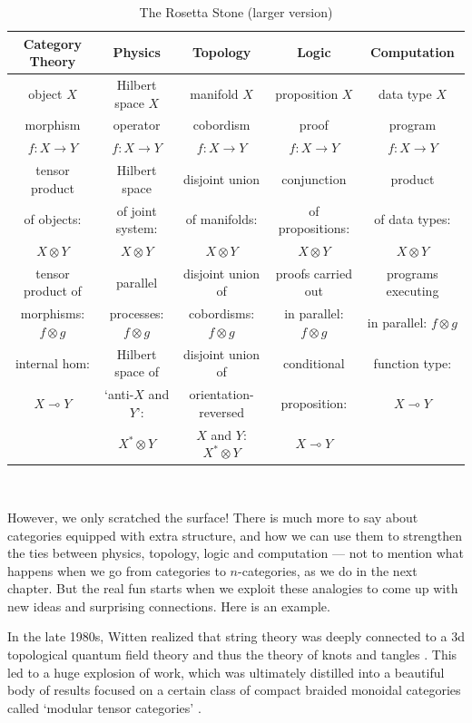 \documentclass[12pt,twoside,openright]{report}
\newcommand{\maps}{\colon}
\newcommand{\lhom}{\multimap}
\newcommand{\tensor}{\otimes}
\begin{document}
\begin{table}[h]
\begin{center}
\begin{tabular}{|c|c|c|c|c|}
\hline Category Theory & Physics & Topology  & Logic & Computation 
\\
\hline object $X$       &
Hilbert space $X$  &
manifold $X$ &
proposition $X$ &
data type $X$
\\
\hline morphism &
operator &
cobordism &
proof  &
program  \\
$f\maps X \to Y$ &
$f\maps X \to Y$ &
$f \maps X \to Y$ &
$f \maps X \to Y$ &
$f \maps X \to Y$
\\
\hline tensor product  &
Hilbert space   &
disjoint union &
conjunction &
product 
\\
of objects: &
of joint system: &
of manifolds: &
of propositions: &
of data types: 
\\
$X \tensor Y$ &
$X \tensor Y$ &
$X \tensor Y$ &
$X \tensor Y$ &
$X \tensor Y$
\\
\hline tensor product of &
parallel  &
disjoint union of &
proofs carried out & 
programs executing
\\
morphisms: $f \tensor g$ & 
processes: $f \tensor g$ & 
cobordisms: $f \tensor g$ & 
in parallel: $f \tensor g$ &
in parallel: $f \tensor g$
\\
\hline internal hom:   &
Hilbert space of &
disjoint union of  &
conditional &
function type:
\\
$X \lhom Y$    &
`anti-$X$ and $Y$':  &
orientation-reversed &
proposition: &
$X \lhom Y$
\\
    &
$X^* \tensor Y$    &
$X$ and $Y$: $X^* \tensor Y$ &
$X \lhom Y$ &
\\
\hline
\end{tabular}
\\
\caption{The Rosetta Stone (larger version)}
\label{analogy_detailed}
\end{center}
\end{table}

However, we only scratched the surface!   There is much more to say about categories equipped with extra structure, and how we can use them to strengthen the ties between physics, topology, logic and computation ---
not to mention what happens when we go from categories to $n$-categories, as we do in the next chapter. But the real fun starts when we exploit these analogies to come up with new ideas and surprising connections.  Here is an example.

In the late 1980s, Witten \cite{Witten}
realized that string theory was deeply connected to a 3d topological quantum field theory and thus the theory of knots and tangles 
\cite{Kohno}.   This led to a huge explosion of work, which was ultimately distilled into a beautiful body of results focused on a certain class of compact braided monoidal categories called `modular tensor categories' \cite{BK,Turaev}.  
\end{document}
